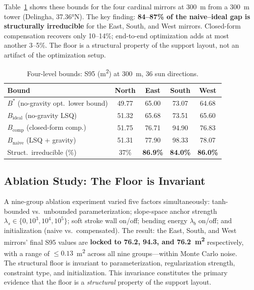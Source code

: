 \documentclass{CVM}
\begin{document}
Table~\ref{tab:bounds} shows these bounds for the four cardinal mirrors at
\SI{300}{\meter} from a \SI{300}{\meter} tower (Delingha, 37.36\si{\degree}N).
The key finding: \textbf{84--87\% of the naive--ideal gap is structurally
irreducible} for the East, South, and West mirrors. Closed-form compensation
recovers only 10--14\%; end-to-end optimization adds at most another 3--5\%.
The floor is a structural property of the support layout, not an artifact of
the optimization setup.

\begin{table}[t]
\centering
\caption{Four-level bounds: S95 (m\textsuperscript{2}) at \SI{300}{\meter},
36 sun directions.}
\label{tab:bounds}
\small
\begin{tabular}{lcccc}
\toprule
Bound & North & East & South & West \\
\midrule
$B^*$ (no-gravity opt.\ lower bound) & 49.77 & 65.00 & 73.07 & 64.68 \\
$B_{\text{ideal}}$ (no-gravity LSQ) & 51.32 & 65.68 & 73.51 & 65.60 \\
$B_{\text{comp}}$ (closed-form comp.)  & 51.75 & 76.71 & 94.90 & 76.83 \\
$B_{\text{naive}}$ (LSQ + gravity)    & 51.31 & 77.90 & 98.33 & 78.07 \\
\midrule
Struct.\ irreducible (\%) & 37\% & \textbf{86.9\%} & \textbf{84.0\%} & \textbf{86.0\%} \\
\bottomrule
\end{tabular}
\end{table}

\subsection{Ablation Study: The Floor is Invariant}

A nine-group ablation experiment varied five factors simultaneously:
tanh-bounded vs.\ unbounded parameterization; slope-space anchor strength
$\lambda_s \in \{0, 10^3, 10^4, 10^5\}$; soft stroke wall on/off; bending
energy $\lambda_b$ on/off; and initialization (naive vs.\ compensated). The
result: the East, South, and West mirrors' final S95 values are \textbf{locked
to 76.2, 94.3, and 76.2~m\textsuperscript{2}} respectively, with a range of
$\le 0.13$~m\textsuperscript{2} across all nine groups---within Monte Carlo
noise. The structural floor is invariant to parameterization, regularization
strength, constraint type, and initialization. This invariance constitutes
the primary evidence that the floor is a \emph{structural} property of the
support layout.
\end{document}
